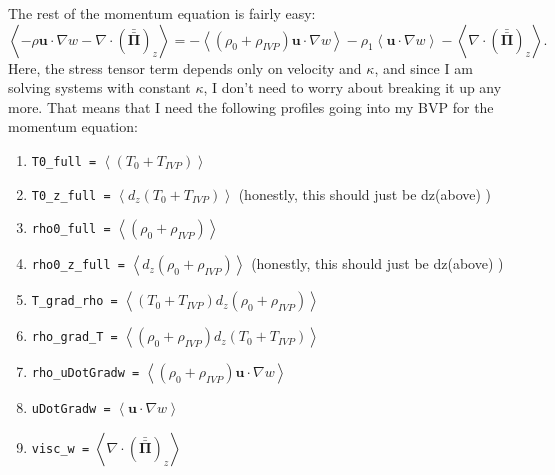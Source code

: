 \documentclass[aps, pre, onecolumn, nofootinbib, notitlepage, groupedaddress, amsfonts, amssymb, amsmath, longbibliography]{revtex4-1}
\newcommand{\Div}[1]{\ensuremath{\nabla\cdot\left( #1\right)}}
\newcommand{\angles}[1]{\ensuremath{\left\langle #1 \right\rangle}}
\newcommand{\grad}{\ensuremath{\nabla}}
\newcommand{\stressT}{\ensuremath{\bm{\bar{\bar{\Pi}}}}}
\begin{document}
The rest of the momentum equation is fairly easy:
\begin{equation}
\angles{-\rho\bm{u}\cdot\grad w - \Div{\stressT}_z} =
- \angles{(\rho_0 + \rho_{IVP})\bm{u}\cdot\grad w} - \rho_1\angles{\bm{u}\cdot\grad w}
- \angles{\Div{\stressT}_z}.
\end{equation}
Here, the stress tensor term depends only on velocity and $\kappa$, and since I am solving systems with constant
$\kappa$, I don't need to worry about breaking it up any more.  That means that I need the
following profiles going into my BVP for the momentum equation:
\begin{enumerate}
\item \texttt{T0\_full =}		 $\angles{(T_0 + T_{IVP})}$
\item \texttt{T0\_z\_full =}		 $\angles{d_z(T_0 + T_{IVP})}$ (honestly, this should just be dz(above) )
\item \texttt{rho0\_full =}		 $\angles{(\rho_0 + \rho_{IVP})}$
\item \texttt{rho0\_z\_full =}	 $\angles{d_z(\rho_0 + \rho_{IVP})}$ (honestly, this should just be dz(above) )
\item \texttt{T\_grad\_rho =}		 $\angles{(T_0 + T_{IVP})d_z(\rho_0 + \rho_{IVP})}$
\item \texttt{rho\_grad\_T =}      $\angles{(\rho_0 + \rho_{IVP})d_z(T_0 + T_{IVP})}$
\item \texttt{rho\_uDotGradw =}   $\angles{(\rho_0 + \rho_{IVP})\bm{u}\cdot\grad w}$
\item \texttt{uDotGradw =}       $\angles{\bm{u}\cdot\grad w}$
\item \texttt{visc\_w =}         $\angles{\Div{\stressT}_z}$
\end{enumerate}
\end{document}
